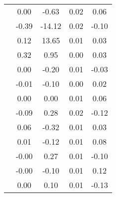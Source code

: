 \begin{table}
\begin{tabular}{c|cc|cc|}
\multicolumn{1}{|c|}{} & \multicolumn{1}{|c|}{      0.00} & \multicolumn{1}{|c|}{     -0.63} & \multicolumn{1}{|c|}{      0.02} & \multicolumn{1}{|c|}{      0.06} \\ 
\multicolumn{1}{|c|}{} & \multicolumn{1}{|c|}{     -0.39} & \multicolumn{1}{|c|}{    -14.12} & \multicolumn{1}{|c|}{      0.02} & \multicolumn{1}{|c|}{     -0.10} \\ 
\multicolumn{1}{|c|}{} & \multicolumn{1}{|c|}{      0.12} & \multicolumn{1}{|c|}{     13.65} & \multicolumn{1}{|c|}{      0.01} & \multicolumn{1}{|c|}{      0.03} \\ 
\multicolumn{1}{|c|}{} & \multicolumn{1}{|c|}{      0.32} & \multicolumn{1}{|c|}{      0.95} & \multicolumn{1}{|c|}{      0.00} & \multicolumn{1}{|c|}{      0.03} \\ 
\multicolumn{1}{|c|}{} & \multicolumn{1}{|c|}{      0.00} & \multicolumn{1}{|c|}{     -0.20} & \multicolumn{1}{|c|}{      0.01} & \multicolumn{1}{|c|}{     -0.03} \\ 
\multicolumn{1}{|c|}{} & \multicolumn{1}{|c|}{     -0.01} & \multicolumn{1}{|c|}{     -0.10} & \multicolumn{1}{|c|}{      0.00} & \multicolumn{1}{|c|}{      0.02} \\ 
\multicolumn{1}{|c|}{} & \multicolumn{1}{|c|}{      0.00} & \multicolumn{1}{|c|}{      0.00} & \multicolumn{1}{|c|}{      0.01} & \multicolumn{1}{|c|}{      0.06} \\ 
\multicolumn{1}{|c|}{} & \multicolumn{1}{|c|}{     -0.09} & \multicolumn{1}{|c|}{      0.28} & \multicolumn{1}{|c|}{      0.02} & \multicolumn{1}{|c|}{     -0.12} \\ 
\multicolumn{1}{|c|}{} & \multicolumn{1}{|c|}{      0.06} & \multicolumn{1}{|c|}{     -0.32} & \multicolumn{1}{|c|}{      0.01} & \multicolumn{1}{|c|}{      0.03} \\ 
\multicolumn{1}{|c|}{} & \multicolumn{1}{|c|}{      0.01} & \multicolumn{1}{|c|}{     -0.12} & \multicolumn{1}{|c|}{      0.01} & \multicolumn{1}{|c|}{      0.08} \\ 
\multicolumn{1}{|c|}{} & \multicolumn{1}{|c|}{     -0.00} & \multicolumn{1}{|c|}{      0.27} & \multicolumn{1}{|c|}{      0.01} & \multicolumn{1}{|c|}{     -0.10} \\ 
\multicolumn{1}{|c|}{} & \multicolumn{1}{|c|}{     -0.00} & \multicolumn{1}{|c|}{     -0.10} & \multicolumn{1}{|c|}{      0.01} & \multicolumn{1}{|c|}{      0.12} \\ 
\multicolumn{1}{|c|}{} & \multicolumn{1}{|c|}{      0.00} & \multicolumn{1}{|c|}{      0.10} & \multicolumn{1}{|c|}{      0.01} & \multicolumn{1}{|c|}{     -0.13} \\ 

\end{tabular}
\end{table}
